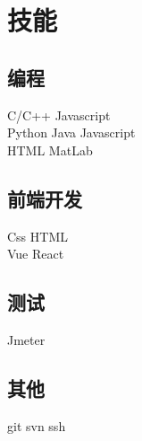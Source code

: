 \documentclass[]{deedy-resume-openfont}
\begin{document}
\begin{minipage}[t]{0.3\textwidth}

\section{技能}
\sectionsep
\subsection{编程}
C/C++ \textbullet{} Javascript \\
Python \textbullet{} Java \textbullet{} Javascript \\
HTML \textbullet{} MatLab \textbullet{} \\ 
\sectionsep

\subsection{前端开发}
Css \textbullet{} HTML \textbullet{} \\
Vue \textbullet{} React \textbullet{}\\
\sectionsep

\subsection{测试}
Jmeter  \\
\sectionsep

\subsection{其他}
git \textbullet svn \textbullet ssh \\

%
%

\end{minipage} 
\hfill
\end{document}
